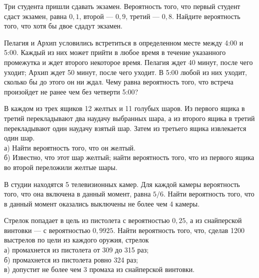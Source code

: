 

\begin{zkrW}{20}\noindent 
	Три студента пришли сдавать экзамен. Вероятность того, что первый студент сдаст экзамен, равна $0{,}1$, второй --- $0{,}9$, третий --- $0{,}8$. Найдите вероятность того, что хотя бы двое сдадут экзамен.
 
\end{zkrW}

\begin{zkrW}{20}\noindent 
	Пелагия и Архип условились встретиться в определенном месте между 4:00 и 5:00. Каждый из них может прийти в любое время в течение указанного промежутка и ждет второго некоторое время. Пелагия ждет 40 минут, после чего уходит; Архип ждет 50 минут, после чего уходит. В 5:00 любой из них уходит, сколько бы до этого он ни ждал. Чему равна вероятность того, что встреча произойдет не ранее чем без четверти 5:00?
 
\end{zkrW}

\begin{zkrW}{20}\noindent 
	В каждом из трех ящиков 12 желтых и 11 голубых шаров. Из первого ящика в третий перекладывают два наудачу выбранных шара, а из второго ящика в третий перекладывают один наудачу взятый шар. Затем из третьего ящика извлекается один шар. \\ \indent а) Найти вероятность того, что он желтый. \\ \indent б) Известно, что этот шар желтый; найти вероятность того, что из первого ящика во второй переложили желтые шары.
 
\end{zkrW}

\begin{zkrW}{20}\noindent 
	В студии находятся 5 телевизионных камер. Для каждой камеры вероятность того, что она включена в данный момент, равна $5/6$. Найти вероятность того, что в данный момент оказались выключены не более чем 4 камеры.
 
\end{zkrW}

\begin{zkrW}{20}\noindent 
	Стрелок попадает в цель из пистолета с вероятностью $0{,}25$, а из снайперской винтовки --- с вероятностью $0{,}9925$. Найти вероятность того, что, сделав 1200 выстрелов по цели из каждого оружия, стрелок \\ \indent а) промахнется из пистолета от 309 до 315 раз; \\ \indent б) промахнется из пистолета ровно 324 раз; \\ \indent в) допустит не более чем 3 промаха из снайперской винтовки.
 
\end{zkrW}

